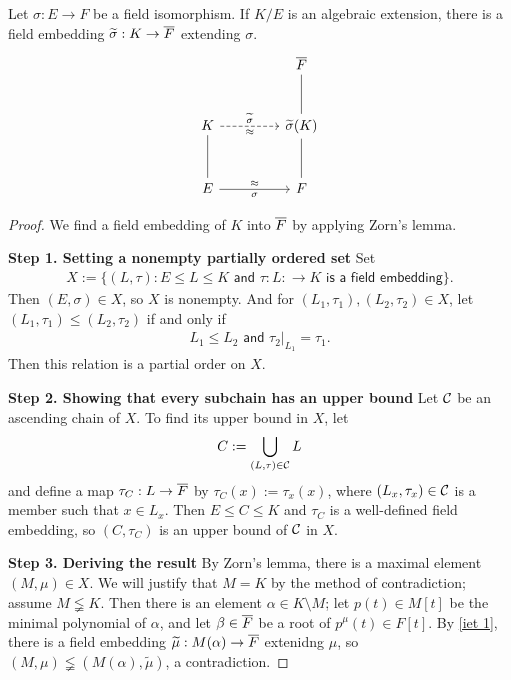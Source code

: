 \begin{thm}\label{iet 3}
    Let $\sigma: E\rightarrow F$ be a field isomorphism.
    If $K/E$ is an algebraic extension, there is a field embedding $\widetilde{\sigma}: K\rightarrow\overline{F}$ extending $\sigma$.
    \begin{equation*}
        \begin{tikzcd}[row sep=1.0cm, column sep=1.5cm]
            &   \ol F\\
            K\arrow[r, "\widetilde{\sigma}", "\approx"', dashed]
            &
            \widetilde{\sigma}(K)\arrow[u, dash]\\
            E\arrow[u, dash]\arrow[r, "\approx", "\sigma"']
            &
            F\arrow[u, dash]
        \end{tikzcd}
    \end{equation*}
\end{thm}
\begin{proof}
    We find a field embedding of $K$ into $\overline{F}$ by applying Zorn's lemma.

    \textbf{Step 1. Setting a nonempty partially ordered set}\newline\noindent
    Set
    \begin{align*}
        X:=\{(L, \tau): E\leq L\leq K\textsf{ and }\tau: L:\rightarrow K\textsf{ is a field embedding}\}.
    \end{align*}
    Then $(E, \sigma)\in X$, so $X$ is nonempty.
    And for $(L_1, \tau_1), (L_2, \tau_2)\in X$, let $(L_1, \tau_1)\leq(L_2, \tau_2)$ if and only if
    \begin{align*}
        L_1\leq L_2\textsf{ and } \tau_2|_{L_1}=\tau_1.
    \end{align*}
    \color{brown}Then this relation is a partial order on $X$.\color{black}

    \textbf{Step 2. Showing that every subchain has an upper bound}\newline\noindent
    Let ${\mathcal{C}}$ be an ascending chain of $X$.
    To find its upper bound in $X$, let
    \begin{align*}
        C:=\bigcup_{(L, \tau)\in {\mathcal{C}}} L
    \end{align*}
    and define a map $\tau_C: L\rightarrow \overline{F}$ by $\tau_C(x):=\tau_x(x)$, where $(L_x, \tau_x)\in{\mathcal{C}}$ is a member such that $x\in L_x$.
    \color{brown}Then $E\leq C\leq K$ and $\tau_C$ is a well-defined field embedding, \color{black}so $(C, \tau_C)$ is an upper bound of ${\mathcal{C}}$ in $X$.

    \textbf{Step 3. Deriving the result}\newline\noindent
    By Zorn's lemma, there is a maximal element $(M, \mu)\in X$.
    We will justify that $M=K$ by the method of contradiction; assume $M\lneqq K$.
    Then there is an element $\alpha\in K\setminus M$; let $p(t)\in M[t]$ be the minimal polynomial of $\alpha$, and let $\beta\in \overline{F}$ be a root of $p^\mu(t)\in F[t]$.
    By \cref{iet 1}, there is a field embedding $\widetilde{\mu}: M(\alpha)\rightarrow\overline{F}$ extenidng $\mu$, so $(M, \mu)\lneqq(M(\alpha), \widetilde{\mu})$, a contradiction.
\end{proof}
